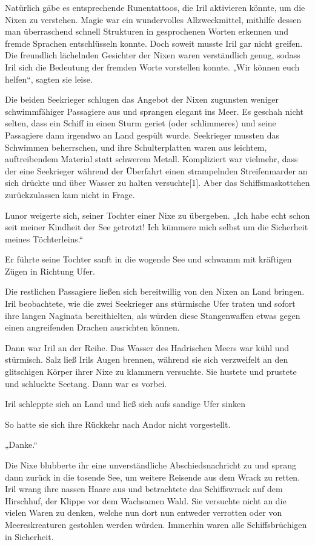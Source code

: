 Natürlich gäbe es entsprechende Runentattoos, die Iril aktivieren könnte, um die Nixen zu verstehen. Magie war ein wundervolles Allzweckmittel, mithilfe dessen man überraschend schnell Strukturen in gesprochenen Worten erkennen und fremde Sprachen entschlüsseln konnte. Doch soweit musste Iril gar nicht greifen. Die freundlich lächelnden Gesichter der Nixen waren verständlich genug, sodass Iril sich die Bedeutung der fremden Worte vorstellen konnte. „Wir können euch helfen“, sagten sie leise.

Die beiden Seekrieger schlugen das Angebot der Nixen zugunsten weniger schwimmfähiger Passagiere aus und sprangen elegant ins Meer. Es geschah nicht selten, dass ein Schiff in einen Sturm geriet (oder schlimmeres) und seine Passagiere dann irgendwo an Land gespült wurde. Seekrieger mussten das Schwimmen beherrschen, und ihre Schulterplatten waren aus leichtem, auftreibendem Material statt schwerem Metall. Kompliziert war vielmehr, dass der eine Seekrieger während der Überfahrt einen strampelnden Streifenmarder an sich drückte und über Wasser zu halten versuchte[1]. Aber das Schiffsmaskottchen zurückzulassen kam nicht in Frage.

Lunor weigerte sich, seiner Tochter einer Nixe zu übergeben. „Ich habe echt schon seit meiner Kindheit der See getrotzt! Ich kümmere mich selbst um die Sicherheit meines Töchterleins.“

Er führte seine Tochter sanft in die wogende See und schwamm mit kräftigen Zügen in Richtung Ufer.

Die restlichen Passagiere ließen sich bereitwillig von den Nixen an Land bringen. Iril beobachtete, wie die zwei Seekrieger ans stürmische Ufer traten und sofort ihre langen Naginata bereithielten, als würden diese Stangenwaffen etwas gegen einen angreifenden Drachen ausrichten können.

Dann war Iril an der Reihe. Das Wasser des Hadrischen Meers war kühl und stürmisch. Salz ließ Irils Augen brennen, während sie sich verzweifelt an den glitschigen Körper ihrer Nixe zu klammern versuchte. Sie hustete und prustete und schluckte Seetang. Dann war es vorbei.

Iril schleppte sich an Land und ließ sich aufs sandige Ufer sinken

So hatte sie sich ihre Rückkehr nach Andor nicht vorgestellt.

„Danke.“

Die Nixe blubberte ihr eine unverständliche Abschiedsnachricht zu und sprang dann zurück in die tosende See, um weitere Reisende aus dem Wrack zu retten. Iril wrang ihre nassen Haare aus und betrachtete das Schiffswrack auf dem Hirschhuf, der Klippe vor dem Wachsamen Wald. Sie versuchte nicht an die vielen Waren zu denken, welche nun dort nun entweder verrotten oder von Meereskreaturen gestohlen werden würden. Immerhin waren alle Schiffsbrüchigen in Sicherheit.

